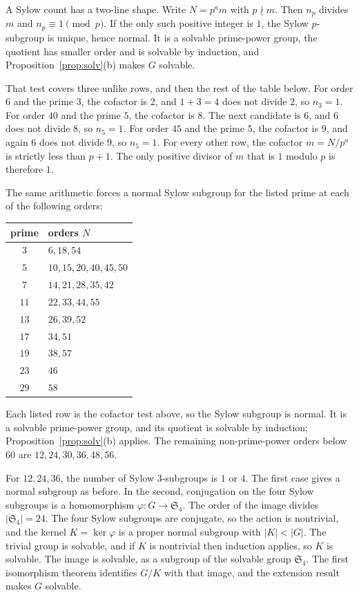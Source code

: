 A Sylow count has a two-line shape. Write $N=p^am$ with $p\nmid m$. Then $n_p$ divides $m$ and $n_p\equiv1\pmod p$. If the only such positive integer is $1$, the Sylow $p$-subgroup is unique, hence normal. It is a solvable prime-power group, the quotient has smaller order and is solvable by induction, and Proposition~\ref{prop:solv}(b) makes $G$ solvable.

That test covers three unlike rows, and then the rest of the table below.
For order $6$ and the prime $3$, the cofactor is $2$, and $1+3=4$ does not divide $2$, so $n_3=1$.
For order $40$ and the prime $5$, the cofactor is $8$. The next candidate is $6$, and $6$ does not divide $8$, so $n_5=1$.
For order $45$ and the prime $5$, the cofactor is $9$, and again $6$ does not divide $9$, so $n_5=1$.
For every other row, the cofactor $m=N/p^a$ is strictly less than $p+1$. The only positive divisor of $m$ that is $1$ modulo $p$ is therefore $1$.

The same arithmetic forces a normal Sylow subgroup for the listed prime at each of the following orders:
\begin{center}\small
\begin{tabular}{c|l}
prime & orders $N$\\\hline
$3$ & $6,18,54$\\
$5$ & $10,15,20,40,45,50$\\
$7$ & $14,21,28,35,42$\\
$11$ & $22,33,44,55$\\
$13$ & $26,39,52$\\
$17$ & $34,51$\\
$19$ & $38,57$\\
$23$ & $46$\\
$29$ & $58$
\end{tabular}\end{center}
Each listed row is the cofactor test above, so the Sylow subgroup is normal.
It is a solvable prime-power group, and
its quotient is solvable by induction; Proposition~\ref{prop:solv}(b) applies.
The remaining non-prime-power orders below $60$ are
$12,24,30,36,48,56$.

For $12,24,36$, the number of Sylow $3$-subgroups is $1$ or $4$.
The first case gives a normal subgroup as before. In the second, conjugation
on the four Sylow subgroups is a homomorphism $\varphi:G\to\mathfrak S_4$.
The order of the image divides $|\mathfrak S_4|=24$. The four Sylow subgroups are conjugate, so the action is nontrivial,
and the kernel $K=\ker\varphi$ is a proper normal subgroup with $|K|<|G|$.
The trivial group is solvable, and if $K$ is nontrivial then induction applies, so $K$ is solvable. The image is solvable, as a subgroup of the solvable group $\mathfrak S_4$.
The first isomorphism theorem identifies $G/K$ with that image, and the extension result makes $G$ solvable.

